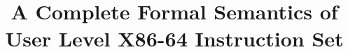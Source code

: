 \documentclass[pageno]{styles/jpaper}
\begin{document}
\title{
A Complete Formal Semantics of User Level X86-64 Instruction Set}

\date{}
\maketitle

\thispagestyle{empty}











\begin{appendices}

\end{appendices}




\end{document}
